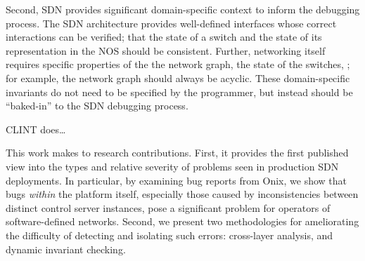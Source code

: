 Second, SDN provides significant domain-specific context to inform the debugging process.
The  SDN architecture provides well-defined interfaces whose correct interactions can be verified; \eg{} that the state of a switch and the state of its representation in the NOS should be consistent.
Further, networking itself requires specific properties of the the network graph, the state of the switches, \etc{}; for example, the network graph should always be acyclic.
These domain-specific invariants do not need to be specified by the programmer, but instead should be ``baked-in'' to the SDN debugging process.

CLINT does\ldots

This work makes to research contributions. First, it provides the first
published view into the types and relative severity of problems seen in production SDN deployments. In particular, by
examining bug reports from Onix, we show that bugs {\it within} the platform
itself, especially those caused by inconsistencies between distinct control server
instances, pose a significant problem for operators of software-defined
networks. Second, we present two methodologies for ameliorating the difficulty of
detecting and isolating such errors: cross-layer analysis, and dynamic invariant checking.
